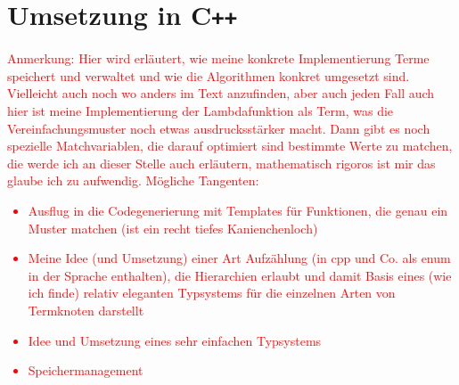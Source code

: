 \documentclass{article}
\begin{document}
\section{Umsetzung in C\texttt{++}}
\textcolor{red}{
\begin{itshape}
Anmerkung: Hier wird erläutert, wie meine konkrete Implementierung Terme speichert und verwaltet und wie die Algorithmen konkret umgesetzt sind. Vielleicht auch noch wo anders im Text anzufinden, aber auch jeden Fall auch hier ist meine Implementierung der Lambdafunktion als Term, was die Vereinfachungsmuster noch etwas ausdrucksstärker macht. Dann gibt es noch spezielle Matchvariablen, die darauf optimiert sind bestimmte Werte zu matchen, die werde ich an dieser Stelle auch erläutern, mathematisch rigoros ist mir das glaube ich zu aufwendig.
Mögliche Tangenten:
\begin{itemize}
\item {Ausflug in die Codegenerierung mit Templates für Funktionen, die genau ein Muster matchen (ist ein recht tiefes Kanienchenloch)}
\item {Meine Idee (und Umsetzung) einer Art Aufzählung (in cpp und Co. als enum in der Sprache enthalten), die Hierarchien erlaubt und damit Basis eines (wie ich finde) relativ eleganten Typsystems für die einzelnen Arten von Termknoten darstellt}
\item {Idee und Umsetzung eines sehr einfachen Typsystems}
\item {Speichermanagement}
\end{itemize}
\end{itshape}
}
\end{document}
